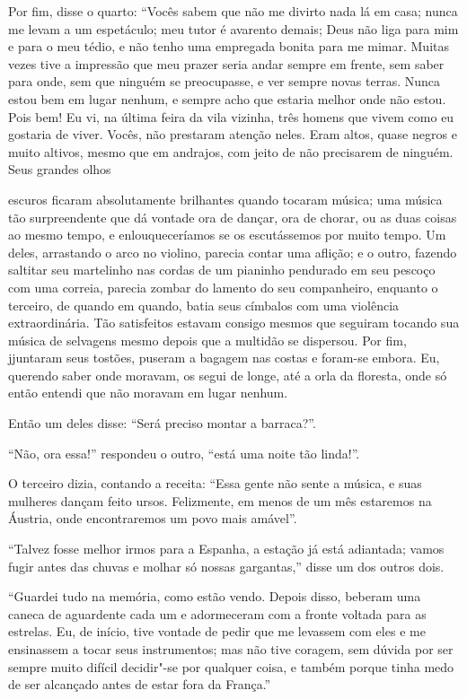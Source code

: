 Por fim, disse o quarto: “Vocês sabem que não me divirto
nada lá em casa; nunca me levam a um espetáculo; meu tutor é avarento
demais; Deus não liga para mim e para o meu tédio, e não tenho uma
empregada bonita para me mimar. Muitas vezes tive a impressão que meu prazer
seria andar sempre em frente, sem saber para onde, sem que ninguém se
preocupasse, e ver sempre novas terras. Nunca estou bem em lugar
nenhum, e sempre acho que estaria melhor onde não estou. Pois bem! Eu
vi, na última feira da vila vizinha, três homens que vivem como eu
gostaria de viver. Vocês, não prestaram atenção neles. Eram
altos, quase negros e muito altivos, mesmo que em andrajos, com jeito
de não precisarem de ninguém. Seus grandes olhos \linebreak

\quebra

\noindent{}escuros ficaram
absolutamente brilhantes quando tocaram música; uma música tão
surpreendente que dá vontade ora de dançar, ora de chorar, ou as duas
coisas ao mesmo tempo, e enlouqueceríamos se os escutássemos por muito
tempo. Um deles, arrastando o arco no violino, parecia contar uma
aflição; e o outro, fazendo saltitar seu martelinho nas cordas de um
pianinho pendurado em seu pescoço com uma correia, parecia zombar
do lamento do seu companheiro, enquanto o terceiro, de quando
em quando, batia seus címbalos com uma violência extraordinária. Tão
satisfeitos estavam consigo mesmos que seguiram tocando sua música de
selvagens mesmo depois que a multidão se dispersou. Por fim, jjuntaram
seus tostões, puseram a bagagem nas costas e foram-se embora. Eu,
querendo saber onde moravam, os segui de longe, até a orla da
floresta, onde só então entendi que não moravam em lugar nenhum.

Então um deles disse: “Será preciso montar a
barraca?''.

“Não, ora essa!'' respondeu o outro,
“está uma noite tão linda!''.

O terceiro dizia, contando a receita: “Essa gente não
sente a música, e suas mulheres dançam feito ursos. Felizmente, em menos
de um mês estaremos na Áustria, onde encontraremos um povo mais
amável''.

“Talvez fosse melhor irmos para a Espanha, a estação
já está adiantada; vamos fugir antes das chuvas e molhar só nossas
gargantas,'' disse um dos outros dois.

\quebra

“Guardei tudo na memória, como estão vendo. Depois disso, 
beberam uma caneca de aguardente cada um e adormeceram com a fronte
voltada para as estrelas. Eu, de início, tive vontade de
pedir que me levassem com eles e me ensinassem a tocar seus
instrumentos; mas não tive coragem, sem dúvida por ser sempre muito
difícil decidir"-se por qualquer coisa, e também porque tinha medo
de ser alcançado antes de estar fora da França.''

